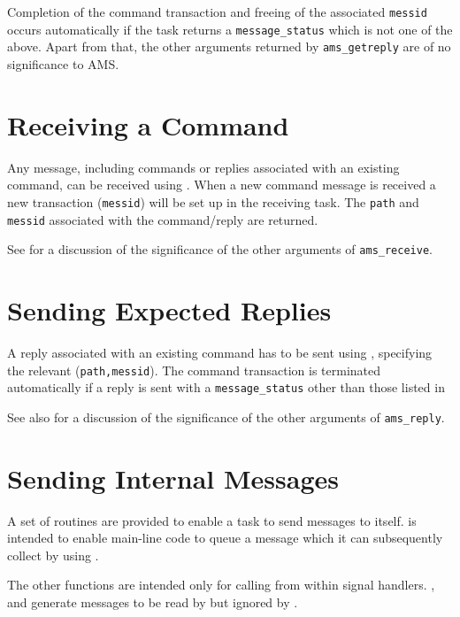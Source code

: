 \documentclass[twoside,11pt,nolof]{starlink}
\begin{document}
Completion of the command transaction and freeing of the associated
\texttt{messid} occurs automatically if the task returns a
\texttt{message\_status} which is not one of the above.  Apart from that, the
other arguments returned by \texttt{ams\_getreply} are of no significance to
AMS.

\section{\label{receiving_a_command}Receiving a Command}
Any message, including commands or replies associated with an existing command,
can be received using
.
When a new command message is received a new transaction (\texttt{messid})
will be set up in the receiving task.
The \texttt{path} and \texttt{messid} associated with the command/reply are
returned.

See
 for a discussion of the significance of the other
arguments of
\texttt{ams\_receive}.

\section{\label{sending_expected_replies}Sending Expected Replies}
A reply associated with an existing command has to be sent using
,
specifying the relevant (\texttt{path,messid}).
The command transaction is terminated automatically if a reply is sent with a
\texttt{message\_status} other than those listed in

See also
 for a discussion of the significance of the other
arguments of
\texttt{ams\_reply}.

\section{Sending Internal Messages}
A set of routines are provided to enable a task to send messages to itself.
is intended to enable main-line code to queue a message which it can
subsequently collect by using
.

The other functions are intended only for calling from within signal handlers.
,
and
generate messages to be read by
but ignored by
.
\end{document}
